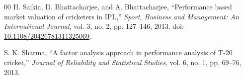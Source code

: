 \documentclass[conference]{IEEEtran}
\begin{document}
\begin{thebibliography}{00}
 H. Saikia, D. Bhattacharjee, and A. Bhattacharjee,
``Performance based market valuation of cricketers in IPL,''
\emph{Sport, Business and Management: An International Journal}, vol. 3,
no. 2, pp. 127--146, 2013. doi: \href{https://doi.org/10.1108/20426781311325069}{10.1108/20426781311325069}.

 S. K. Sharma, ``A factor analysis approach in
performance analysis of T-20 cricket,'' \emph{Journal of Reliability and
Statistical Studies}, vol. 6, no. 1, pp. 69--76, 2013.

\end{thebibliography}
\end{document}
